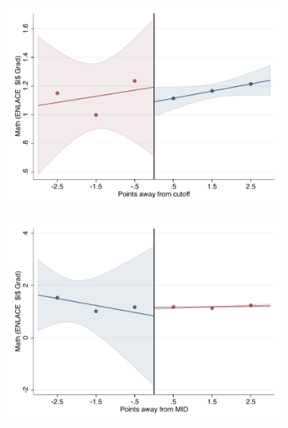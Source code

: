 \documentclass[oneside,11pt]{article}
\begin{document}
\begin{figure}[H]
\begin{center}
    \begin{subfigure}{0.475\textwidth}
        \centering
        \includegraphics[width=\textwidth]{04_Figures/rd_plot_tau_p_mat_3_UNAM3.pdf}
    \end{subfigure}
    \begin{subfigure}{0.475\textwidth}
        \centering
        \includegraphics[width=\textwidth]{04_Figures/rd_plot_mid_p_mat_3_UNAM3.pdf}
    \end{subfigure}


\end{center}
\end{figure}
\end{document}
